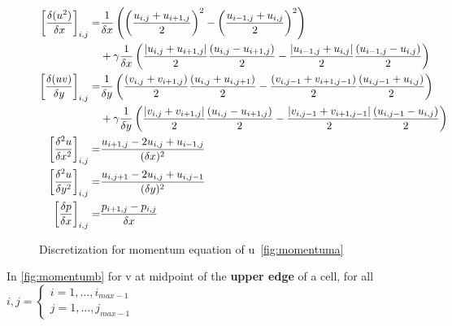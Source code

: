 \begin{figure}[H]
	\centering
	\begin{align*}
	 	\left[ \frac{\delta(u^2)}{\delta x}\right]_{i,j} =& \frac{1}{\delta x}\left( \left(\frac{u_{i,j} + u_{i+1,j}}{2} \right)^2 - \left(\frac{u_{i-1,j} + u_{i,j}}{2}\right)^2 \right) \\ &+ \gamma\frac{1}{\delta x} \left( \frac{\lvert u_{i,j} +u_{i+1,j}\rvert}{2} \frac{(u_{i,j} - u_{i+1,j})}{2} - \frac{\lvert u_{i-1,j} + u_{i,j}\rvert}{2} \frac{(u_{i-1,j} - u_{i,j})}{2} \right) \\		
	 	\left[ \frac{\delta(uv)}{\delta y}\right]_{i,j} =& \frac{1}{\delta y} \left( \frac{(v_{i,j} + v_{i+1,j})}{2} \frac{(u_{i,j} + u_{i,j+1})}{2} - \frac{(v_{i,j-1} + v_{i+1,j-1})}{2} \frac{(u_{i,j-1} + u_{i,j})}{2} \right) \\ &+ \gamma \frac{1}{\delta y}  \left( \frac{\lvert v_{i,j} + v_{i+1,j}\rvert}{2} \frac{(u_{i,j} - u_{i+1,j})}{2} - \frac{\lvert v_{i,j-1} + v_{i+1,j-1}\rvert}{2} \frac{(u_{i,j-1} - u_{i,j})}{2} \right) \\
	 	\left[ \frac{\delta^2 u}{\delta x^2}\right]_{i,j} =& \frac{u_{i+1, j} - 2u_{i,j} + u_{i-1,j}}{(\delta x)^2} \\
	 	\left[ \frac{\delta^2 u}{\delta y^2}\right]_{i,j} =& \frac{u_{i, j+1} - 2u_{i,j}  +u_{i,j-1}}{(\delta y)^2} \\
	 	\left[ \frac{\delta p}{\delta x}\right]_{i,j} =& \frac{p_{i+1,j} - p_{i,j}}{\delta x}
	\end{align*}
	
	\renewcommand{\thefigure}{3.19a}
	\caption{Discretization for momentum equation of u~\ref{fig:momentuma}}
	\label{fig:disc-moma}
\end{figure}


In \ref{fig:momentumb} for v at midpoint of the \textbf{upper edge} of a cell, for all $i,j = \begin{cases}
i = 1, \dots, i_{max-1} \\
j = 1, \dots, j_{max-1}
\end{cases}$

